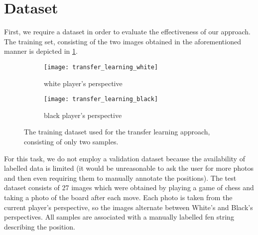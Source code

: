 \documentclass[../report.tex]{subfiles}
\begin{document}
\section{Dataset}
First, we require a dataset in order to evaluate the effectiveness of our approach.
The training set, consisting of the two images obtained in the aforementioned manner is depicted in \cref{fig:transfer_learning_train_data}.
\begin{figure}
    \centering
    \begin{subfigure}[b]{0.47\textwidth}
        \centering
        \texttt{[image: transfer\_learning\_white]}
        \caption{white player's perspective}
    \end{subfigure}
    \hfill
    \begin{subfigure}[b]{0.47\textwidth}
        \centering
        \texttt{[image: transfer\_learning\_black]}
        \caption{black player's perspective}
    \end{subfigure}
    \caption{The training dataset used for the transfer learning approach, consisting of only two samples.}
    \label{fig:transfer_learning_train_data}
\end{figure}
For this task, we do not employ a validation dataset because the availability of labelled data is limited (it would be unreasonable to ask the user for more photos and then even requiring them to manually annotate the positions).
The test dataset consists of 27 images which were obtained by playing a game of chess and taking a photo of the board after each move.
Each photo is taken from the current player's perspective, so the images alternate between White's and Black's perspectives.
All samples are associated with a manually labelled \gls{fen} string describing the position.
\end{document}
